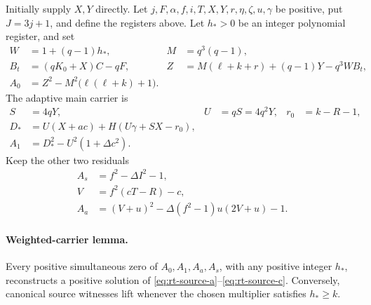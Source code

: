 Initially supply $X,Y$ directly.  Let $j,F,\alpha,f,i,T,X,Y,r,\eta,
\zeta,u,\gamma$ be positive, put $J=3j+1$, and define the registers above.
Let $h_*>0$ be an integer polynomial register, and set
\begin{align}
 W&=1+(q-1)h_*,&M&=q^3(q-1),\nonumber\\
 B_t&=(qK_0+X)C-qF,&
 Z&=M(\ell+k+r)+(q-1)Y-q^3WB_t,\label{eq:rt-transport}\\
 A_0&=Z^2-M^2\bigl(\ell(\ell+k)+1\bigr).\nonumber
\end{align}
The adaptive main carrier is
\begin{align}
 S&=4qY,& U&=qS=4q^2Y,& r_0&=k-R-1,\nonumber\\
 D_*&=U(X+ac)+H(U\gamma+SX-r_0),\label{eq:rt-main}\\
 A_1&=D_*^2-U^2(1+\Delta c^2).\nonumber
\end{align}
Keep the other two residuals
\begin{align}
 A_s&=f^2-\Delta I^2-1,\nonumber\\
 V&=f^2(cT-R)-c,\nonumber\\
 A_a&=(V+u)^2-\Delta(f^2-1)u(2V+u)-1.\label{eq:rt-aux}
\end{align}

\paragraph{Weighted-carrier lemma.}
Every positive simultaneous zero of $A_0,A_1,A_a,A_s$, with any positive
integer $h_*$, reconstructs a positive solution of
\eqref{eq:rt-source-a}--\eqref{eq:rt-source-c}.  Conversely, canonical
source witnesses lift whenever the chosen multiplier satisfies $h_*\ge k$.

